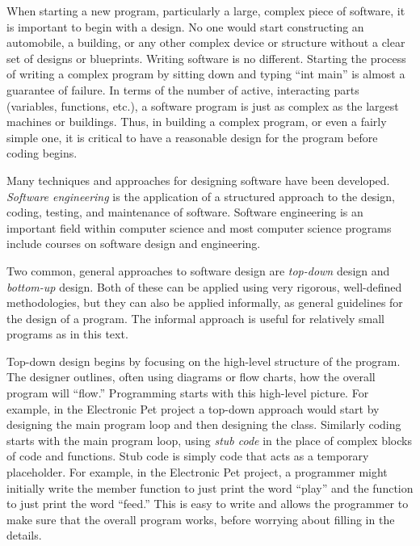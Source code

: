 
When starting a new program, particularly a large, complex piece of software, it is important to begin with a design.  No one would start constructing an automobile, a building, or any other complex device or structure without a clear set of designs or blueprints.  Writing software is no different.  Starting the process of writing a complex program by sitting down and typing ``int main'' is almost a guarantee of failure.   In terms of the number of active, interacting parts (variables, functions, etc.), a software program is just as complex as the largest machines or buildings.  Thus, in building a complex program, or even a fairly simple one, it is critical to have a reasonable design for the program before coding begins.

Many techniques and approaches for designing software have been developed.  \emph{Software engineering} is the application of a structured approach to the design, coding, testing, and maintenance of software.  Software engineering is an important field within computer science and most computer science programs include courses on software design and engineering.

Two common, general approaches to software design are \emph{top-down} design and \emph{bottom-up} design.  Both of these can be applied using very rigorous, well-defined methodologies, but they can also be applied informally, as general guidelines for the design of a program.  The informal approach is useful for relatively small programs as in this text.

Top-down design begins by focusing on the high-level structure of the program.  The designer outlines, often using diagrams or flow charts, how the overall program will ``flow.''  Programming starts with this high-level picture.  For example, in the Electronic Pet project a top-down approach would start by designing the main program loop and then designing the  class.  Similarly coding starts with the main program loop, using \emph{stub code} in the place of complex blocks of code and functions.  Stub code is simply code that acts as a temporary placeholder.  For example, in the Electronic Pet project, a programmer might initially write the  member function to just print the word ``play'' and the  function to just print the word ``feed.''  This is easy to write and allows the programmer to make sure that the overall program works, before worrying about filling in the details.  

